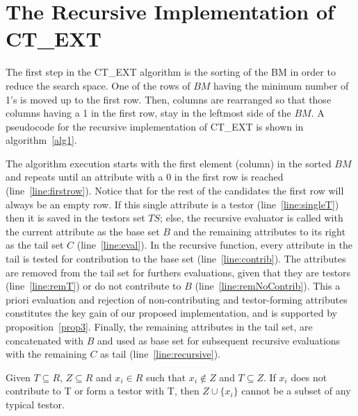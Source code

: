 \documentclass[citeauthoryear]{llncs}
\begin{document}
\section{The Recursive Implementation of CT\_EXT}
%
	The first step in the CT\_EXT algorithm is the sorting of the BM in order to reduce the search space. One of 
	the rows of $BM$ having the minimum number of 1's is moved up to the first row. Then, columns are rearranged 
	so that those columns having a 1 in the first row, stay in the leftmost side of the $BM$.  A pseudocode for
	the recursive implementation of CT\_EXT is shown in algorithm~\ref{alg1}. 

	The algorithm execution starts with the first element (column) in the sorted $BM$ and repeats until an 
	attribute with a 0 in the first row is reached (line~\ref{line:firstrow}). Notice that for the rest of the
	candidates the first row will always be an empty row. If this single attribute is a testor (line~\ref{line:singleT})
	then it is saved in the testors set $TS$; else, the recursive evaluator is called with the current attribute
	as the base set $B$ and the remaining attributes to its right as the tail set $C$ (line~\ref{line:eval}).
	In the recursive function, every attribute in the tail is tested for contribution to the base set 
	(line~\ref{line:contrib}). The attributes are removed from the tail set for furthers evaluations, given
	that they are testors (line~\ref{line:remT}) or do not contribute to $B$ (line~\ref{line:remNoContrib}).
	This a priori evaluation and rejection of non-contributing and testor-forming attributes constitutes the key
	gain of our proposed implementation, and is supported by proposition~\ref{prop3}.
	Finally, the remaining attributes in the tail set, are concatenated with $B$ and used as base set for
	subsequent recursive evaluations with the remaining $C$ as tail (line~\ref{line:recursive}).

	\begin{proposition}\label{prop3} 
		Given $T \subseteq R$, $Z \subseteq R$ and  $x_i \in R$ such that $x_i \notin Z$ and $T \subseteq Z$. If 
		$x_i$ does not contribute to T or form a testor with T, then 	$Z\cup\{x_i\}$ cannot be a subset of any 
		typical testor.
	\end{proposition}	
	
\end{document}
